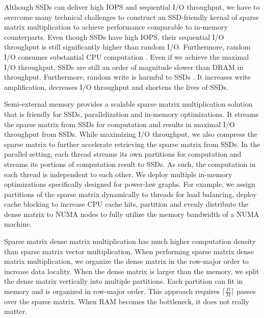 

Although SSDs can deliver high IOPS and sequential I/O throughput, we have
to overcome many technical challenges to construct an SSD-friendly kernal
of sparse matrix multiplication to achieve performance comparable to in-memory
counterparts. Even though SSDs have high IOPS, their sequential I/O throughput
is still significantly higher than random I/O. Furthermore, random I/O
consumes substantial CPU computation \cite{safs}. Even if we achieve
the maximal I/O throughput, SSDs are still an order of magnitude slower
than DRAM in throughput. Furthermore, random write is harmful to SSDs
\cite{sfs}. It increases write amplification, decreases I/O throughput
and shortens the lives of SSDs.

Semi-external memory provides a scalable sparse matrix multiplication solution
that is friendly for SSDs, parallelization and in-memory optimizations.
It streams the sparse matrix from SSDs for computation and results in maximal
I/O throughput from SSDs. While maximizing I/O throughput, we also compress
the sparse matrix to further accelerate retrieving the sparse matrix from SSDs.
In the parallel setting, each thread streams its own partitions for computation
and streams its portions of computation result to SSDs. As such, the computation
in each thread is independent to each other.
We deploy multiple in-memory optimizations specifically designed for power-law
graphs. For example, we assign partitions of the sparse matrix dynamically to
threads for load balancing, deploy cache blocking to increase CPU cache hits,
partition and evenly distribute the dense matrix to NUMA nodes to fully utilize
the memory bandwidth of a NUMA machine.

Sparse matrix dense matrix multiplication has much higher computation density
than sparse matrix vector multiplication.
When performing sparse matrix dense matrix multiplication, we organize
the dense matrix in the row-major order to increase data locality.
When the dense matrix is larger than the memory, we split the dense matrix
vertically into multiple partitions. Each partition can fit in memory and
is organized in row-major order.
This approach requires $\lceil \frac{D}{M} \rceil$ passes over the sparse
matrix. When RAM becomes the bottleneck, it does not really matter.

